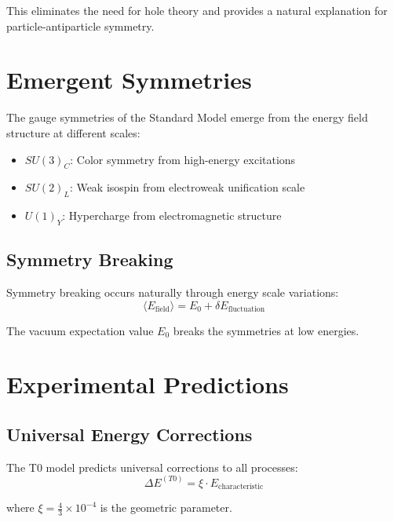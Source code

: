 \documentclass[12pt,a4paper]{report}
\begin{document}
	This eliminates the need for hole theory and provides a natural explanation for particle-antiparticle symmetry.
	
	\section{Emergent Symmetries}
	\label{sec:emergent_symmetries}
	
	The gauge symmetries of the Standard Model emerge from the energy field structure at different scales:
	
	\begin{itemize}
		\item \textbf{$SU(3)_C$}: Color symmetry from high-energy excitations
		\item \textbf{$SU(2)_L$}: Weak isospin from electroweak unification scale
		\item \textbf{$U(1)_Y$}: Hypercharge from electromagnetic structure
	\end{itemize}
	
	\subsection{Symmetry Breaking}
	\label{subsec:symmetry_breaking}
	
	Symmetry breaking occurs naturally through energy scale variations:
	\begin{equation}
		\langle E_{\text{field}} \rangle = E_0 + \delta E_{\text{fluctuation}}
	\end{equation}
	
	The vacuum expectation value $E_0$ breaks the symmetries at low energies.
	
	\section{Experimental Predictions}
	\label{sec:experimental_predictions}
	
	\subsection{Universal Energy Corrections}
	\label{subsec:universal_energy_corrections}
	
	The T0 model predicts universal corrections to all processes:
	\begin{equation}
		\Delta E^{(T0)} = \xi \cdot E_{\text{characteristic}}
	\end{equation}
	
	where $\xi = \frac{4}{3} \times 10^{-4}$ is the geometric parameter.
	
\end{document}
